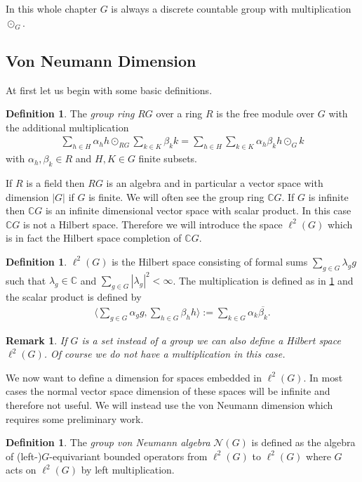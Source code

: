 \documentclass[12pt,a4paper]{scrartcl}
\theoremstyle{plain}
\newtheorem{Remark}[Theorem]{Remark}
\theoremstyle{definition}
\newtheorem{Definition}[Theorem]{Definition}
\numberwithin{equation}{section}
\newcommand{\C}{\mathbb{C}} %
\newcommand{\2}{\mathbb{Z} / 2 \mathbb{Z}}
\newcommand{\1}{\bar{1}}
\newcommand{\0}{\bar{0}}
\begin{document}
In this whole chapter $G$ is always a discrete countable group with multiplication $\odot_G$.
\subsection{Von Neumann Dimension} \label{fiss}
At first let us begin with some basic definitions.
\begin{Definition} \label{GR}
	The \emph{group ring} $RG$ over a ring $R$ is the free module over $G$ with the additional multiplication
	\begin{align*}
		\sum_{h \in H} \alpha_h h \odot_{RG} \sum_{k \in K} \beta_k k = \sum_{h \in H} \sum_{k \in K} \alpha_h \beta_k h \odot_G k
	\end{align*}
	with $\alpha_h, \beta_k \in R$ and $H, K \in G$ finite subsets.
\end{Definition}
If $R$ is a field then $RG$ is an algebra and in particular a vector space with dimension $|G|$ if $G$ is finite. We will often see the group ring $\C G$. If $G$ is infinite then $\C G$ is an infinite dimensional vector space with scalar product. In this case $\C G$ is not a Hilbert space. Therefore we will introduce the space $\ell^2(G)$ which is in fact the Hilbert space completion of $\C G$.
\begin{Definition}
	$\ell^2(G)$ is the Hilbert space consisting of formal sums $\sum_{g \in G} \lambda_g g$ such that $\lambda_g \in \C$ and $\sum_{g \in G} |\lambda_g|^2 < \infty$. The multiplication is defined as in \ref{GR} and the scalar product is defined by
	\begin{align*}
		\langle \sum_{g \in G} \alpha_g g, \sum_{h \in G} \beta_h  h \rangle := \sum_{k \in G} \alpha_k \overline{\beta_k}.
	\end{align*}
\end{Definition}
\begin{Remark}
	If $G$ is a set instead of a group we can also define a Hilbert space $\ell^2(G)$. Of course we do not have a multiplication in this case.
\end{Remark}
We now want to define a dimension for spaces embedded in $\ell^2(G)$. In most cases the normal vector space dimension of these spaces will be infinite and therefore not useful. We will instead use the von Neumann dimension which requires some preliminary work.
\begin{Definition}
	The \emph{group von Neumann algebra} $\mathcal{N}(G)$ is defined as the algebra of (left-)$G$-equivariant bounded operators from $\ell^2(G)$ to $\ell^2(G)$ where $G$ acts on $\ell^2(G)$ by left multiplication.
\end{Definition}
\end{document}
